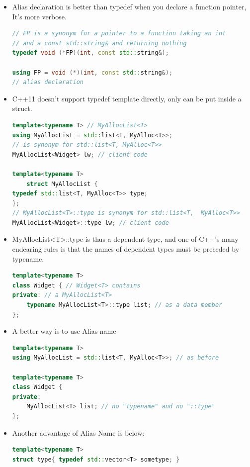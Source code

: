 \documentclass[a4paper,11pt,twoside]{book}
\begin{document}
\begin{itemize}
\item Alias declaration is better than typedef when you declare a function pointer, It's more verbose.
\begin{lstlisting}[frame=single, language=c++]
// FP is a synonym for a pointer to a function taking an int
// and a const std::string& and returning nothing
typedef void (*FP)(int, const std::string&);

using FP = void (*)(int, const std::string&);
// alias declaration
\end{lstlisting}

\item C++11 doesn't support typedef template directly, only can be put inside a struct.
\begin{lstlisting}[frame=single, language=c++]
template<typename T> // MyAllocList<T>
using MyAllocList = std::list<T, MyAlloc<T>>;
// is synonym for std::list<T, MyAlloc<T>>
MyAllocList<Widget> lw; // client code

template<typename T>
	struct MyAllocList {
typedef std::list<T, MyAlloc<T>> type;
};
// MyAllocList<T>::type is synonym for std::list<T,  MyAlloc<T>>
MyAllocList<Widget>::type lw; // client code
\end{lstlisting}

\item MyAllocList<T>::type is thus a dependent type, and one of C++'s many endearing rules is that the names of dependent types must be preceded by typename.

\begin{lstlisting}[frame=single, language=c++]
template<typename T>
class Widget { // Widget<T> contains
private: // a MyAllocList<T>
	typename MyAllocList<T>::type list; // as a data member
};
\end{lstlisting}

\item A better way is to use Alias name
\begin{lstlisting}[frame=single, language=c++]
template<typename T>
using MyAllocList = std::list<T, MyAlloc<T>>; // as before

template<typename T>
class Widget {
private:
	MyAllocList<T> list; // no "typename" and no "::type"
};
\end{lstlisting}

\item Another advantage of Alias Name is below:

\begin{lstlisting}[frame=single, language=c++]
template<typename T>
struct type{ typedef std::vector<T> sometype; }


\end{lstlisting}
\end{itemize}
\end{document}
